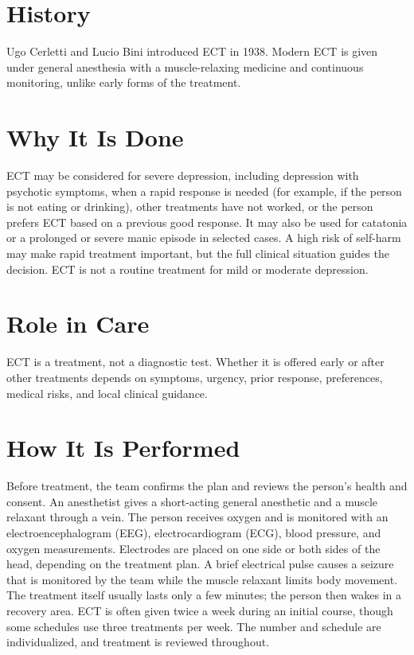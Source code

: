 \section*{History}
Ugo Cerletti and Lucio Bini introduced ECT in 1938. Modern ECT is given under general anesthesia with a muscle-relaxing medicine and continuous monitoring, unlike early forms of the treatment.

\section*{Why It Is Done}
ECT may be considered for severe depression, including depression with psychotic symptoms, when a rapid response is needed (for example, if the person is not eating or drinking), other treatments have not worked, or the person prefers ECT based on a previous good response. It may also be used for catatonia or a prolonged or severe manic episode in selected cases. A high risk of self-harm may make rapid treatment important, but the full clinical situation guides the decision. ECT is not a routine treatment for mild or moderate depression.

\section*{Role in Care}
ECT is a treatment, not a diagnostic test. Whether it is offered early or after other treatments depends on symptoms, urgency, prior response, preferences, medical risks, and local clinical guidance.

\section*{How It Is Performed}
Before treatment, the team confirms the plan and reviews the person's health and consent. An anesthetist gives a short-acting general anesthetic and a muscle relaxant through a vein. The person receives oxygen and is monitored with an electroencephalogram (EEG), electrocardiogram (ECG), blood pressure, and oxygen measurements. Electrodes are placed on one side or both sides of the head, depending on the treatment plan. A brief electrical pulse causes a seizure that is monitored by the team while the muscle relaxant limits body movement. The treatment itself usually lasts only a few minutes; the person then wakes in a recovery area. ECT is often given twice a week during an initial course, though some schedules use three treatments per week. The number and schedule are individualized, and treatment is reviewed throughout.

